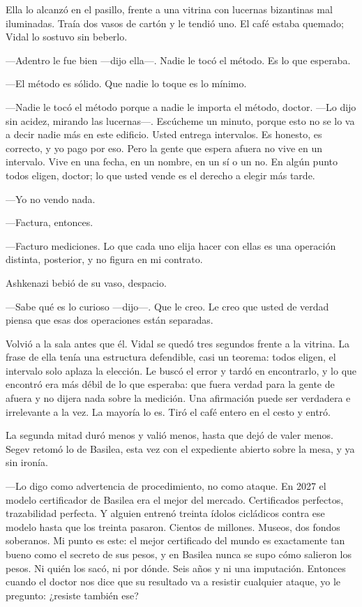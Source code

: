 Ella lo alcanzó en el pasillo, frente a una vitrina con lucernas bizantinas mal iluminadas. Traía dos vasos de cartón y le tendió uno. El café estaba quemado; Vidal lo sostuvo sin beberlo.

---Adentro le fue bien ---dijo ella---. Nadie le tocó el método. Es lo que esperaba.

---El método es sólido. Que nadie lo toque es lo mínimo.

---Nadie le tocó el método porque a nadie le importa el método, doctor. ---Lo dijo sin acidez, mirando las lucernas---. Escúcheme un minuto, porque esto no se lo va a decir nadie más en este edificio. Usted entrega intervalos. Es honesto, es correcto, y yo pago por eso. Pero la gente que espera afuera no vive en un intervalo. Vive en una fecha, en un nombre, en un sí o un no. En algún punto todos eligen, doctor; lo que usted vende es el derecho a elegir más tarde.

---Yo no vendo nada.

---Factura, entonces.

---Facturo mediciones. Lo que cada uno elija hacer con ellas es una operación distinta, posterior, y no figura en mi contrato.

Ashkenazi bebió de su vaso, despacio.

---Sabe qué es lo curioso ---dijo---. Que le creo. Le creo que usted de verdad piensa que esas dos operaciones están separadas.

Volvió a la sala antes que él. Vidal se quedó tres segundos frente a la vitrina. La frase de ella tenía una estructura defendible, casi un teorema: todos eligen, el intervalo solo aplaza la elección. Le buscó el error y tardó en encontrarlo, y lo que encontró era más débil de lo que esperaba: que fuera verdad para la gente de afuera y no dijera nada sobre la medición. Una afirmación puede ser verdadera e irrelevante a la vez. La mayoría lo es. Tiró el café entero en el cesto y entró.

La segunda mitad duró menos y valió menos, hasta que dejó de valer menos. Segev retomó lo de Basilea, esta vez con el expediente abierto sobre la mesa, y ya sin ironía.

---Lo digo como advertencia de procedimiento, no como ataque. En 2027 el modelo certificador de Basilea era el mejor del mercado. Certificados perfectos, trazabilidad perfecta. Y alguien entrenó treinta ídolos cicládicos contra ese modelo hasta que los treinta pasaron. Cientos de millones. Museos, dos fondos soberanos. Mi punto es este: el mejor certificado del mundo es exactamente tan bueno como el secreto de sus pesos, y en Basilea nunca se supo cómo salieron los pesos. Ni quién los sacó, ni por dónde. Seis años y ni una imputación. Entonces cuando el doctor nos dice que su resultado va a resistir cualquier ataque, yo le pregunto: ¿resiste también ese?

